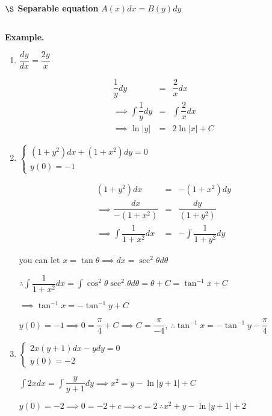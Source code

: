 \textbf{$\S$ Separable equation} $A(x)dx = B(y)dy$

$ $

\textbf{Example.}

\begin{enumerate}[wide]
	\item $\dfrac{dy}{dx} = \dfrac{2y}{x}$
	\begin{solution}
		\begin{eqnarray*}
			\dfrac{1}{y}dy &=& \dfrac{2}{x}dx\\
			\implies \int \dfrac{1}{y}dy &=& \int \dfrac{2}{x}dx\\
			\implies \ln |y| &=& 2\ln|x| + C
		\end{eqnarray*}
	\end{solution}
	
	\item $\begin{cases}
		(1+y^2)dx + (1+x^2)dy = 0\\ y(0) = -1
	\end{cases}$

	\begin{solution}
		\begin{eqnarray*}
			(1+y^2)dx &=& -(1+x^2)dy\\
			\implies \dfrac{dx}{-(1+x^2)} &=& \dfrac{dy}{(1 + y^2)}\\
			\implies \int \dfrac{1}{1+x^2}dx &=& - \int \dfrac{1}{1+y^2}dy
		\end{eqnarray*}
		
		you can let $x = \tan\theta \implies dx = \sec^2\theta d\theta $
		
		$\therefore \int\dfrac{1}{1+x^2}dx = \int \cos^2\theta \sec^2\theta d\theta = \theta + C = \tan^{-1}x + C$
		
		$\implies \tan^{-1}x = -\tan^{-1}y + C$
		
		$y(0) = -1 \implies 0 = \dfrac{\pi}{4} + C \implies C = \dfrac{\pi}{-4},~\therefore \tan^{-1} x = - \tan^{-1}y - \dfrac{\pi}{4}$
	\end{solution}
	
	\newpage
	
	\item $\begin{cases}
		2x(y+1)dx - ydy = 0\\ y(0) = -2
	\end{cases}$
	\begin{solution}
		$\int 2xdx = \int \dfrac{y}{y+1}dy \implies x^2 = y-\ln |y+1| + C$
		
		$y(0) = -2 \implies 0 = -2 + c \implies c = 2 ~\therefore x^2 + y - \ln |y+1| + 2$
	\end{solution}
\end{enumerate}

